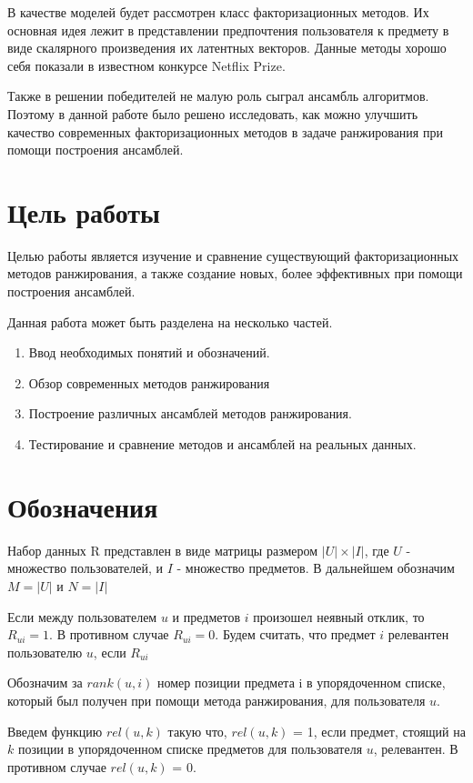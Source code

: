 \documentclass[a4paper,12pt]{article}
\begin{document}
В качестве моделей будет рассмотрен класс факторизационных методов. Их основная идея лежит в представлении предпочтения пользователя к предмету  в виде скалярного произведения их латентных векторов\cite{matrixfactorization}.  Данные методы хорошо себя показали в известном конкурсе Netflix Prize\cite{netflix}.

Также в решении победителей не малую роль сыграл ансамбль алгоритмов. Поэтому в данной работе было  решено исследовать, как можно улучшить качество современных факторизационных методов в задаче ранжирования при помощи  построения ансамблей. 

\section{Цель работы}
Целью работы является изучение и сравнение существующий факторизационных методов ранжирования, а также создание новых, более эффективных при помощи построения ансамблей. 


Данная работа может быть разделена на несколько частей.
\begin{enumerate}
\item Ввод необходимых понятий и обозначений.
\item Обзор современных методов ранжирования
\item Построение различных ансамблей методов ранжирования.
\item Тестирование и сравнение методов и ансамблей на реальных данных.
\end{enumerate}


\section{Обозначения}

Набор данных R представлен в виде матрицы  размером $|U| \times |I|$, где $U$ - множество пользователей, и $I$ - множество предметов. В дальнейшем обозначим $M = |U| $ и $N = |I|$

Если между пользователем $u$ и предметов $i$ произошел неявный отклик, то $R_{ui}=1$. В противном случае $R_{ui} = 0$. Будем считать, что предмет $i$ релевантен пользователю $u$, если $R_{ui}$


Обозначим за $rank(u, i)$ номер позиции предмета i в упорядоченном списке, который был получен при помощи метода ранжирования, для пользователя $u$.   

Введем функцию $rel(u, k)$ такую что, $rel(u, k)$ = 1, если предмет, стоящий на $k$ позиции в упорядоченном списке предметов для пользователя $u$, релевантен. В противном случае $rel(u, k)$ = 0.  
\end{document}
